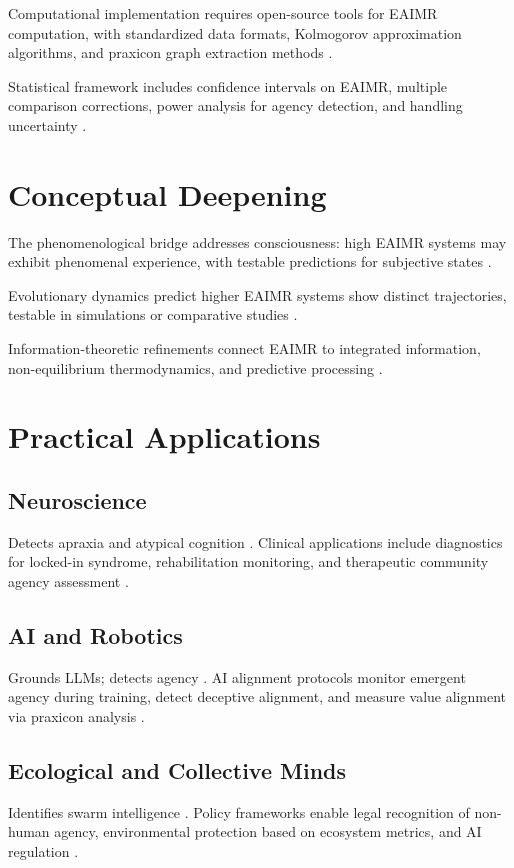 \documentclass{article}
\begin{document}
Computational implementation requires open-source tools for EAIMR computation, with standardized data formats, Kolmogorov approximation algorithms, and praxicon graph extraction methods \citep{kolmogorov1965}.

Statistical framework includes confidence intervals on EAIMR, multiple comparison corrections, power analysis for agency detection, and handling uncertainty \citep{jaynes2003}.

\section{Conceptual Deepening}
\label{sec:conceptual}

The phenomenological bridge addresses consciousness: high EAIMR systems may exhibit phenomenal experience, with testable predictions for subjective states \citep{tononi2004}.

Evolutionary dynamics predict higher EAIMR systems show distinct trajectories, testable in simulations or comparative studies \citep{camazine2001}.

Information-theoretic refinements connect EAIMR to integrated information, non-equilibrium thermodynamics, and predictive processing \citep{friston2010}.

\section{Practical Applications}
\label{sec:applications}

\subsection{Neuroscience}
Detects apraxia and atypical cognition \citep{peigneux2004,zeman2015}. Clinical applications include diagnostics for locked-in syndrome, rehabilitation monitoring, and therapeutic community agency assessment \citep{levin2022technological}.

\subsection{AI and Robotics}
Grounds LLMs; detects agency \citep{pastra2011,anderson2007}. AI alignment protocols monitor emergent agency during training, detect deceptive alignment, and measure value alignment via praxicon analysis \citep{yudkowsky2008artificial}.

\subsection{Ecological and Collective Minds}
Identifies swarm intelligence \citep{camazine2001,simondon2017}. Policy frameworks enable legal recognition of non-human agency, environmental protection based on ecosystem metrics, and AI regulation \citep{bostrom2014superintelligence}.
\end{document}
